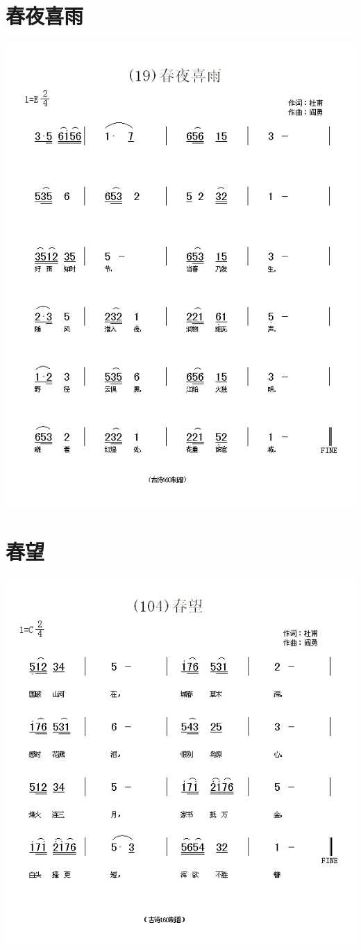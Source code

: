 \documentclass[cn,pad,twocol]{elegantbook}
\begin{document}
\section{春夜喜雨}      \includegraphics[width=\textwidth]{dongxiao/20200808-春夜喜雨-杜甫.jpg}
\section{春望}          \includegraphics[width=\textwidth]{dongxiao/20200808-春望-杜甫.jpg}
\end{document}
